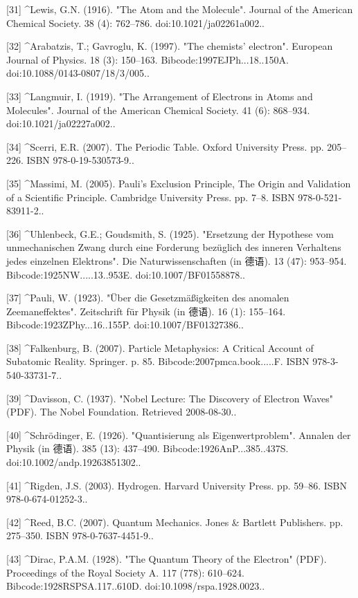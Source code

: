 [31]
^Lewis, G.N. (1916). "The Atom and the Molecule". Journal of the American Chemical Society. 38 (4): 762–786. doi:10.1021/ja02261a002..

[32]
^Arabatzis, T.; Gavroglu, K. (1997). "The chemists' electron". European Journal of Physics. 18 (3): 150–163. Bibcode:1997EJPh...18..150A. doi:10.1088/0143-0807/18/3/005..

[33]
^Langmuir, I. (1919). "The Arrangement of Electrons in Atoms and Molecules". Journal of the American Chemical Society. 41 (6): 868–934. doi:10.1021/ja02227a002..

[34]
^Scerri, E.R. (2007). The Periodic Table. Oxford University Press. pp. 205–226. ISBN 978-0-19-530573-9..

[35]
^Massimi, M. (2005). Pauli's Exclusion Principle, The Origin and Validation of a Scientific Principle. Cambridge University Press. pp. 7–8. ISBN 978-0-521-83911-2..

[36]
^Uhlenbeck, G.E.; Goudsmith, S. (1925). "Ersetzung der Hypothese vom unmechanischen Zwang durch eine Forderung bezüglich des inneren Verhaltens jedes einzelnen Elektrons". Die Naturwissenschaften (in 德语). 13 (47): 953–954. Bibcode:1925NW.....13..953E. doi:10.1007/BF01558878..

[37]
^Pauli, W. (1923). "Über die Gesetzmäßigkeiten des anomalen Zeemaneffektes". Zeitschrift für Physik (in 德语). 16 (1): 155–164. Bibcode:1923ZPhy...16..155P. doi:10.1007/BF01327386..

[38]
^Falkenburg, B. (2007). Particle Metaphysics: A Critical Account of Subatomic Reality. Springer. p. 85. Bibcode:2007pmca.book.....F. ISBN 978-3-540-33731-7..

[39]
^Davisson, C. (1937). "Nobel Lecture: The Discovery of Electron Waves" (PDF). The Nobel Foundation. Retrieved 2008-08-30..

[40]
^Schrödinger, E. (1926). "Quantisierung als Eigenwertproblem". Annalen der Physik (in 德语). 385 (13): 437–490. Bibcode:1926AnP...385..437S. doi:10.1002/andp.19263851302..

[41]
^Rigden, J.S. (2003). Hydrogen. Harvard University Press. pp. 59–86. ISBN 978-0-674-01252-3..

[42]
^Reed, B.C. (2007). Quantum Mechanics. Jones & Bartlett Publishers. pp. 275–350. ISBN 978-0-7637-4451-9..

[43]
^Dirac, P.A.M. (1928). "The Quantum Theory of the Electron" (PDF). Proceedings of the Royal Society A. 117 (778): 610–624. Bibcode:1928RSPSA.117..610D. doi:10.1098/rspa.1928.0023..

